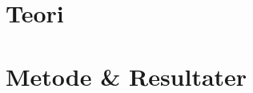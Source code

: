 \documentclass[12pt,twoside,onecolumn]{article}
\begin{document}

\newpage\null\newpage


\newpage\null
\tableofcontents{}
\listoffigures{}
\listoftables{}

\newpage\null
{} 
\part{Teori}

\newpage


\newpage\null


\newpage\null
\part{Metode \& Resultater}

\newpage


\newpage\null


\newpage\null


\newpage\null

\newpage\null

\newpage\null

\newpage\null\thispagestyle{empty}\newpage
\end{document}
